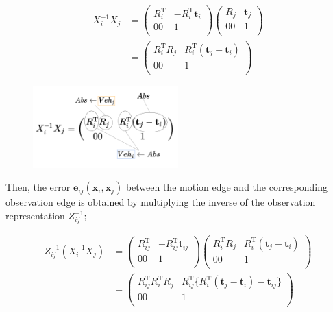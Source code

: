 \documentclass{article}
\begin{document}
\[
\begin{align}
X_i^{-1} X_j &=
\left(
  \begin{array}{cc}
    R_i^{\mathrm{T}} & -R_i^{\mathrm{T}}\bm{t}_i \\
                  00 &                           1 \\
  \end{array}
\right)
\left(
  \begin{array}{cc}
    R_j & \bm{t}_j \\
     00 &          1 \\
  \end{array}
\right) \\ &=
\left(
  \begin{array}{cc}
    R_i^{\mathrm{T}}R_j & R_i^{\mathrm{T}}(\bm{t}_j-\bm{t}_i) \\
                     00 &                                       1 \\
  \end{array}
\right)
\end{align}
\]

\begin{figure}[h!]
  \centering
  \includegraphics[width=0.5\textwidth]{3-1_difference_between_nodes.png}
\end{figure}

Then, the error $\bm{e}_{ij}(\bm{x}_i, \bm{x}_j)$ between the motion edge and the corresponding observation edge is obtained by multiplying the inverse of the observation representation $Z_{ij}^{-1}$;

\[
\begin{align}
Z_{ij}^{-1} (X_i^{-1} X_j) &=
\left(
  \begin{array}{cc}
    R_{ij}^{\mathrm{T}} & -R_{ij}^{\mathrm{T}}\bm{t}_{ij} \\
                     00 &                                 1 \\
  \end{array}
\right)
\left(
  \begin{array}{cc}
    R_i^{\mathrm{T}}R_j & R_i^{\mathrm{T}}(\bm{t}_j-\bm{t}_i) \\
                     00 &                                       1 \\
  \end{array}
\right) \\ &=
\left(
  \begin{array}{cc}
    R_{ij}^{\mathrm{T}}R_i^{\mathrm{T}}R_j & R_{ij}^{\mathrm{T}}\{R_i^{\mathrm{T}}(\bm{t}_j-\bm{t}_i)-\bm{t}_{ij}\} \\
                                        00 &                                                                            1 \\
  \end{array}
\right)
\end{align}
\]
\end{document}
